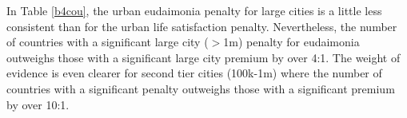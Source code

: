 \documentclass[11pt, letterpaper]{article}
\begin{document}
\begin{spacing}{1.9}
In Table \ref{b4cou}, the urban eudaimonia penalty for large cities is a little less consistent than for the urban life satisfaction penalty. Nevertheless, the number of countries with a significant large city ($>$1m) penalty for
eudaimonia outweighs those with a significant large city premium by over 4:1. The weight of evidence is even
clearer for second tier cities (100k-1m) where the number of countries with a significant penalty outweighs those
with a significant premium by over 10:1.




\end{spacing}
\end{document}
